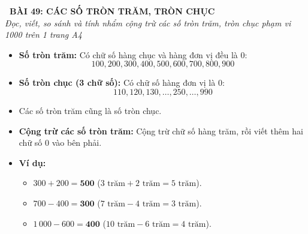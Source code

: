 \documentclass[11pt,a4paper]{article}
\begin{document}
\begin{tcolorbox}[
  enhanced,
  colback=violet!8!white,
  colframe=violet!70!black,
  arc=3mm, boxrule=1.2pt,
  left=3mm, right=3mm, top=2mm, bottom=2mm,
  halign=center
]
  {\LARGE\bfseries\color{violet!90!black}\faBookmark\ BÀI 49: CÁC SỐ TRÒN TRĂM, TRÒN CHỤC}\\[1mm]
  {\itshape\footnotesize\color{black!75} Đọc, viết, so sánh và tính nhẩm cộng trừ các số tròn trăm, tròn chục phạm vi 1000 trên 1 trang A4}
\end{tcolorbox}

\vspace{-2mm}

\noindent
\begin{minipage}[t]{0.49\textwidth}\vspace{0pt}
\begin{tcolorbox}[
  enhanced,
  colback=violet!4!white,
  colframe=violet!75!black,
  arc=2mm, boxrule=0.8pt,
  left=2mm, right=2mm, top=1.8mm, bottom=1.8mm,
  title={\footnotesize\bfseries\color{white}\faKey\ 1. Số tròn trăm và số tròn chục}
]
{\footnotesize
\begin{itemize}\setlength{\itemsep}{1pt}\setlength{\leftskip}{-2.5mm}
  \item \textbf{Số tròn trăm:} Có chữ số hàng chục và hàng đơn vị đều là $0$:
  $$100, 200, 300, 400, 500, 600, 700, 800, 900$$
  \item \textbf{Số tròn chục (3 chữ số):} Có chữ số hàng đơn vị là $0$:
  $$110, 120, 130, \dots, 250, \dots, 990$$
  \item Các số tròn trăm cũng là số tròn chục.
\end{itemize}
}
\end{tcolorbox}
\end{minipage}
\hfill
\begin{minipage}[t]{0.49\textwidth}\vspace{0pt}
\begin{tcolorbox}[
  enhanced,
  colback=teal!4!white,
  colframe=teal!75!black,
  arc=2mm, boxrule=0.8pt,
  left=2mm, right=2mm, top=1.8mm, bottom=1.8mm,
  title={\footnotesize\bfseries\color{white}\faSliders\ 2. Kĩ năng tính nhẩm tròn trăm}
]
{\footnotesize
\begin{itemize}\setlength{\itemsep}{1pt}\setlength{\leftskip}{-2.5mm}
  \item \textbf{Cộng trừ các số tròn trăm:}
  Cộng trừ chữ số hàng trăm, rồi viết thêm hai chữ số $0$ vào bên phải.
  \item \textbf{Ví dụ:}
  \begin{itemize}\setlength{\itemsep}{0.5pt}\setlength{\leftskip}{-2.5mm}
    \item $300 + 200 = \mathbf{500}$ ($3\text{ trăm} + 2\text{ trăm} = 5\text{ trăm}$).
    \item $700 - 400 = \mathbf{300}$ ($7\text{ trăm} - 4\text{ trăm} = 3\text{ trăm}$).
    \item $1\,000 - 600 = \mathbf{400}$ ($10\text{ trăm} - 6\text{ trăm} = 4\text{ trăm}$).
  \end{itemize}
\end{itemize}
}
\end{tcolorbox}
\end{minipage}
\end{document}
